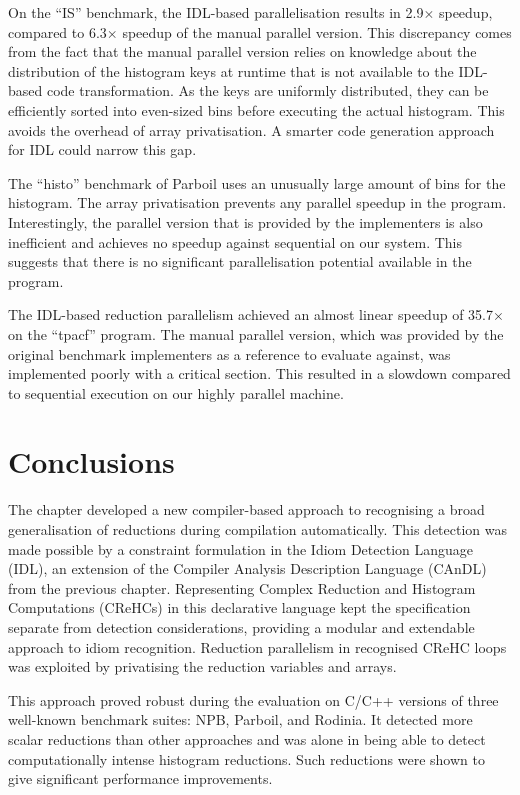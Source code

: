     On the ``IS'' benchmark, the IDL-based parallelisation results in
    2.9$\times$ speedup, compared to 6.3$\times$ speedup of the manual parallel
    version.
    This discrepancy comes from the fact that the manual parallel version relies
    on knowledge about the distribution of the histogram keys at runtime that is
    not available to the IDL-based code transformation.
    As the keys are uniformly distributed, they can be efficiently sorted into
    even-sized bins before executing the actual histogram.
    This avoids the overhead of array privatisation.
    A smarter code generation approach for IDL could narrow this gap.

    The ``histo'' benchmark of Parboil uses an unusually large amount of bins
    for the histogram.
    The array privatisation prevents any parallel speedup in the program.
    Interestingly, the parallel version that is provided by the implementers is
    also inefficient and achieves no speedup against sequential on our system.
    This suggests that there is no significant parallelisation potential
    available in the program.

    The IDL-based reduction parallelism achieved an almost linear speedup of
    35.7$\times$ on the ``tpacf'' program.
    The manual parallel version, which was provided by the original benchmark
    implementers as a reference to evaluate against, was implemented poorly with
    a critical section.
    This resulted in a slowdown compared to sequential execution on our highly
    parallel machine.

\section{Conclusions}

    The chapter developed a new compiler-based approach to recognising a broad
    generalisation of reductions during compilation automatically.
    This detection was made possible by a constraint formulation in the
    Idiom Detection Language (IDL), an extension of the
    Compiler Analysis Description Language (CAnDL) from the previous chapter.
    Representing Complex Reduction and Histogram Computations (CReHCs) in
    this declarative language kept the specification separate from
    detection considerations, providing a modular and extendable approach to
    idiom recognition.
    Reduction parallelism in recognised CReHC loops was exploited by
    privatising the reduction variables and arrays.

    This approach proved robust during the evaluation on C/C++ versions of
    three well-known benchmark suites: NPB, Parboil, and Rodinia.
    It detected more scalar reductions than other approaches and was alone in
    being able to detect computationally intense histogram reductions.
    Such reductions were shown to give significant performance improvements.

